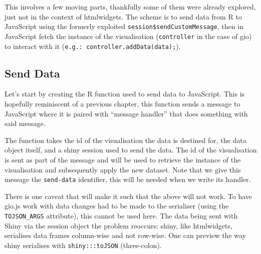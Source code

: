 \documentclass[
]{krantz}
\makeatletter
\newenvironment{Shaded}{\begin{snugshade}}{\end{snugshade}}
\newcommand{\CommentTok}[1]{\textcolor[rgb]{0.37,0.37,0.37}{\textit{#1}}}
\newcommand{\ControlFlowTok}[1]{\textcolor[rgb]{0.27,0.27,0.27}{\textbf{#1}}}
\newcommand{\DataTypeTok}[1]{\textcolor[rgb]{0.27,0.27,0.27}{#1}}
\newcommand{\KeywordTok}[1]{\textcolor[rgb]{0.27,0.27,0.27}{\textbf{#1}}}
\newcommand{\NormalTok}[1]{#1}
\newcommand{\OperatorTok}[1]{\textcolor[rgb]{0.43,0.43,0.43}{\textbf{#1}}}
\newcommand{\StringTok}[1]{\textcolor[rgb]{0.5,0.5,0.5}{#1}}
\newenvironment{kframe}{%
\medskip{}
\setlength{\fboxsep}{.8em}
 \def\at@end@of@kframe{}%
 \ifinner\ifhmode%
  \def\at@end@of@kframe{\end{minipage}}%
  \begin{minipage}{\columnwidth}%
 \fi\fi%
 \def\FrameCommand##1{\hskip\@totalleftmargin \hskip-\fboxsep
 \colorbox{shadecolor}{##1}\hskip-\fboxsep
     \hskip-\linewidth \hskip-\@totalleftmargin \hskip\columnwidth}%
 \MakeFramed {\advance\hsize-\width
   \@totalleftmargin\z@ \linewidth\hsize
   \@setminipage}}%
 {\par\unskip\endMakeFramed%
 \at@end@of@kframe}
\renewenvironment{Shaded}{\begin{kframe}}{\end{kframe}}
\makeatother
\begin{document}
This involves a few moving parts, thankfully some of them were already explored, just not in the context of htmlwidgets. The scheme is to send data from R to JavaScript using the formerly exploited \texttt{session\$sendCustomMessage}, then in JavaScript fetch the instance of the visualisation (\texttt{controller} in the case of gio) to interact with it (\texttt{e.g.:\ controller.addData(data);}).

\hypertarget{send-data}{%
\subsection{Send Data}\label{send-data}}

Let's start by creating the R function used to send data to JavaScript. This is hopefully reminiscent of a previous chapter, this function sends a message to JavaScript where it is paired with ``message handler'' that does something with said message.

\begin{Shaded}
\end{Shaded}

The function takes the id of the visualisation the data is destined for, the data object itself, and a shiny session used to send the data. The id of the visualisation is sent as part of the message and will be used to retrieve the instance of the visualisation and subsequently apply the new dataset. Note that we give this message the \texttt{send-data} identifier, this will be needed when we write its handler.

There is one caveat that will make it such that the above will not work. To have gio.js work with data changes had to be made to the serialiser (using the \texttt{TOJSON\_ARGS} attribute), this cannot be used here. The data being sent with Shiny via the session object the problem reoccurs: shiny, like htmlwidgets, serialises data frames column-wise and not row-wise. One can preview the way shiny serialises with \texttt{shiny:::toJSON} (three-colon).
\end{document}
